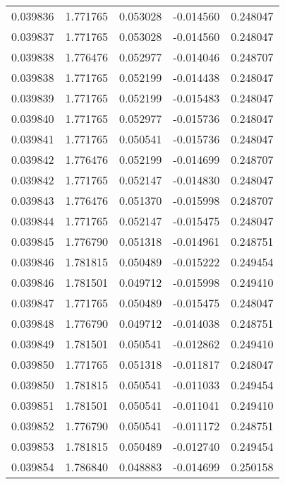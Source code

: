 \begin{tabular}{lrrrr}
0.039836    &  1.771765 &  0.053028 & -0.014560 &             0.248047 \\
0.039837    &  1.771765 &  0.053028 & -0.014560 &             0.248047 \\
0.039838    &  1.776476 &  0.052977 & -0.014046 &             0.248707 \\
0.039838    &  1.771765 &  0.052199 & -0.014438 &             0.248047 \\
0.039839    &  1.771765 &  0.052199 & -0.015483 &             0.248047 \\
0.039840    &  1.771765 &  0.052977 & -0.015736 &             0.248047 \\
0.039841    &  1.771765 &  0.050541 & -0.015736 &             0.248047 \\
0.039842    &  1.776476 &  0.052199 & -0.014699 &             0.248707 \\
0.039842    &  1.771765 &  0.052147 & -0.014830 &             0.248047 \\
0.039843    &  1.776476 &  0.051370 & -0.015998 &             0.248707 \\
0.039844    &  1.771765 &  0.052147 & -0.015475 &             0.248047 \\
0.039845    &  1.776790 &  0.051318 & -0.014961 &             0.248751 \\
0.039846    &  1.781815 &  0.050489 & -0.015222 &             0.249454 \\
0.039846    &  1.781501 &  0.049712 & -0.015998 &             0.249410 \\
0.039847    &  1.771765 &  0.050489 & -0.015475 &             0.248047 \\
0.039848    &  1.776790 &  0.049712 & -0.014038 &             0.248751 \\
0.039849    &  1.781501 &  0.050541 & -0.012862 &             0.249410 \\
0.039850    &  1.771765 &  0.051318 & -0.011817 &             0.248047 \\
0.039850    &  1.781815 &  0.050541 & -0.011033 &             0.249454 \\
0.039851    &  1.781501 &  0.050541 & -0.011041 &             0.249410 \\
0.039852    &  1.776790 &  0.050541 & -0.011172 &             0.248751 \\
0.039853    &  1.781815 &  0.050489 & -0.012740 &             0.249454 \\
0.039854    &  1.786840 &  0.048883 & -0.014699 &             0.250158 \\

\end{tabular}
